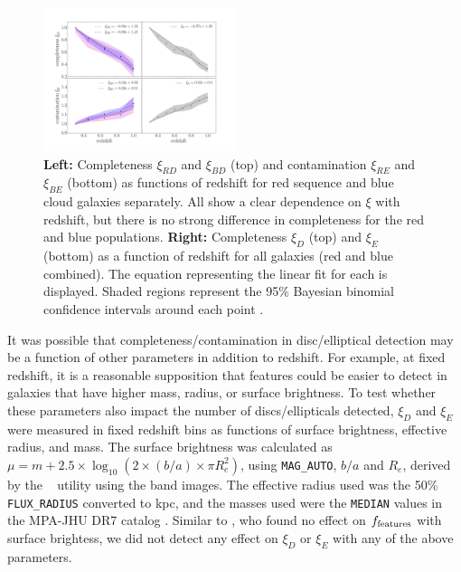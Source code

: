 \documentclass[useAMS,usenatbib]{mn2e}
\begin{document}
\begin{figure}
\centering
\includegraphics[width=0.5\textwidth,trim={3cm 1.5cm 3cm 3cm},clip]{figures/completeness_full.pdf}
\caption{\textbf{Left:} Completeness $\xi_{RD}$ and $\xi_{BD}$ (top) and contamination $\xi_{RE}$ and $\xi_{BE}$ (bottom) as functions of redshift for red sequence and blue cloud  galaxies separately. All show a clear dependence on $\xi$ with redshift, but there is no strong difference in completeness for the red and blue populations. \textbf{Right:} Completeness $\xi_D$ (top) and $\xi_E$ (bottom) as a function of redshift for all   galaxies (red and blue combined). The equation representing the linear fit for each is displayed. Shaded regions represent the 95\% Bayesian binomial confidence intervals around each point \citep{Cameron2013}. }
\label{fig:xi}
\end{figure}


It was possible that completeness/contamination in disc/elliptical detection may be a function of other parameters in addition to redshift. For example, at fixed redshift, it is a reasonable supposition that features could be easier to detect in galaxies that have higher mass, radius, or surface brightness. To test whether these parameters also impact the number of discs/ellipticals detected, $\xi_D$ and $\xi_E$ were measured in fixed redshift bins as functions of surface brightness, effective radius, and mass. The surface brightness was calculated as $\mu = m + 2.5 \times \log_{10}{(2 \times (b/a) \times \pi R_e^2 )}$, using {\tt MAG\_AUTO}, $b/a$ and $R_{e}$, derived by the \sextractor{}~\citep{Bertin1996} utility using the \Iband{} band images. The effective radius used was the 50\% {\tt FLUX\_RADIUS} converted to kpc, and the masses used were the {\tt MEDIAN} values in the MPA-JHU DR7 catalog \citep{Kauffmann2003b}. Similar to \citet{Willett2016}, who found no effect on $f_{\rm features}$ with surface brightess, we did not detect any effect on $\xi_D$ or $\xi_E$ with any of the above parameters. 
\end{document}
